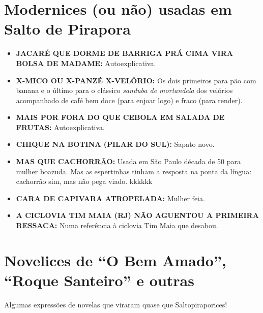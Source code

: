\documentclass[12pt,brazil,]{book}
\providecommand{\tightlist}{%
  \setlength{\itemsep}{0pt}\setlength{\parskip}{0pt}}
\begin{document}
\section{Modernices (ou não) usadas em Salto de
Pirapora}\label{modernices-ou-nuxe3o-usadas-em-salto-de-pirapora}

\begin{itemize}
\tightlist
\item
  \textbf{JACARÉ QUE DORME DE BARRIGA PRÁ CIMA VIRA BOLSA DE MADAME:}
  Autoexplicativa.\\
\item
  \textbf{X-MICO OU X-PANZÉ X-VELÓRIO:} Os dois primeiros para pão com
  banana e o último para o clássico \emph{sanduba de mortandela} dos
  velórios acompanhado de café bem doce (para enjoar logo) e fraco (para
  render).\\
\item
  \textbf{MAIS POR FORA DO QUE CEBOLA EM SALADA DE FRUTAS:}
  Autoexplicativa.\\
\item
  \textbf{CHIQUE NA BOTINA (PILAR DO SUL):} Sapato novo.\\
\item
  \textbf{MAS QUE CACHORRÃO:} Usada em São Paulo década de 50 para
  mulher boazuda. Mas as espertinhas tinham a resposta na ponta da
  língua: cachorrão sim, mas não pega viado. kkkkkk\\
\item
  \textbf{CARA DE CAPIVARA ATROPELADA:} Mulher feia.\\
\item
  \textbf{A CICLOVIA TIM MAIA (RJ) NÃO AGUENTOU A PRIMEIRA RESSACA:}
  Numa referência à ciclovia Tim Maia que desabou.
\end{itemize}

\section{\texorpdfstring{Novelices de ``O Bem Amado'', ``Roque
Santeiro'' e
outras}{Novelices de O Bem Amado, Roque Santeiro e outras}}\label{novelices-de-o-bem-amado-roque-santeiro-e-outras}

Algumas expressões de novelas que viraram quase que Saltopiraporices!
\end{document}
